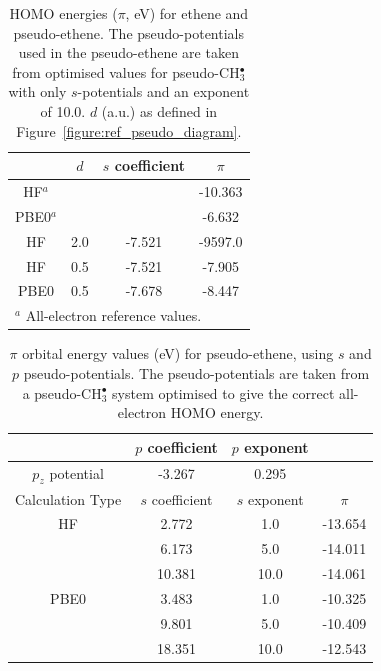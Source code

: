 \documentclass[aip]{revtex4-1}
\begin{document}
\newpage

\begin{table}[ht]
\begin{tabular}{c c c c}
\hline\hline
& $d$ & \(s\) coefficient & \( \pi \)  \\
\hline
HF$^a$   &     &        & -10.363 \\
PBE0$^a$ &     &        & -6.632 \\
HF       & 2.0 & -7.521 & -9597.0 \\
HF       & 0.5 & -7.521  & -7.905 \\
PBE0     & 0.5 &-7.678  & -8.447 \\
\hline\hline
\multicolumn{4}{l}{$^a$ All-electron reference values.}\\
\end{tabular}
\caption{HOMO energies ($\pi$, eV) for ethene and pseudo-ethene. The pseudo-potentials used in the pseudo-ethene are taken from optimised values for 
pseudo-CH\(^{\bullet}_{3}\) with only \(s\)-potentials and an exponent of 10.0. $d$ (a.u.) as defined 
in Figure~\ref{figure:ref_pseudo_diagram}.}
\label{table:ethene_s_pseudo}
\end{table}

\newpage

\begin{table}[ht]
\begin{tabular}{c c c c}
\hline\hline
& \(p\) coefficient & \(p\) exponent \\
\hline
\(p_{z}\) potential & -3.267 & 0.295 \\
\hline
Calculation Type & \(s\) coefficient & \(s\) exponent & \(\pi\) \\
\hline
HF & 2.772 & 1.0 & -13.654 \\
 & 6.173 & 5.0 & -14.011 \\
 & 10.381 & 10.0 & -14.061 \\
\hline
PBE0 & 3.483 & 1.0 & -10.325 \\
 & 9.801 & 5.0 & -10.409 \\
 & 18.351 & 10.0 & -12.543 \\
\hline\hline
\end{tabular}
\caption{\(\pi\) orbital energy values (eV) for pseudo-ethene, using \(s\) and \(p\) pseudo-potentials.
The pseudo-potentials are taken from a pseudo-CH\(^{\bullet}_{3}\) system optimised to give the correct all-electron HOMO energy.}
\label{table:p_potentials}
\end{table}
\end{document}
